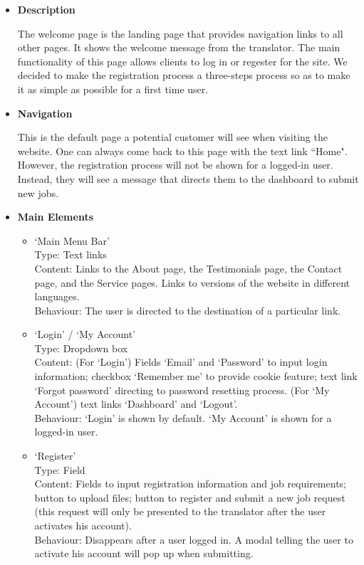 \documentclass{l3proj}
\begin{document}
\begin{itemize}
\item \textbf{Description}

The welcome page is the landing page that provides navigation links to all other pages. It shows the welcome message from the translator.
The main functionality of this page allows clients to log in or regester for the site. 
We decided to make the registration process a three-steps process so as to make it as simple as possible for a first time user.

\item \textbf{Navigation}

This is the default page a potential customer will see when visiting the website. One can always come back to this page with the text link ``Home".
However, the registration process will not be shown for a logged-in user. Instead, they will see a message that directs them to the dashboard to submit new jobs.

\item \textbf{Main Elements}
\begin{itemize}
\item `Main Menu Bar'\\
Type: Text links\\
Content: Links to the About page, the Testimonials page, the Contact page, and the Service pages. Links to versions of the website in different languages. \\
Behaviour: The user is directed to the destination of a particular link. \\

\item `Login' / `My Account'\\
Type: Dropdown box\\
Content: (For `Login') Fields `Email' and `Password' to input login information; checkbox `Remember me' to provide cookie feature; 
text link `Forgot password' directing to password resetting process. (For `My Account') text links `Dashboard' and `Logout'.\\
Behaviour: `Login' is shown by default. `My Account' is shown for a logged-in user.\\

\item `Register'\\
Type: Field\\
Content: Fields to input registration information and job requirements; button to upload files; 
button to register and submit a new job request (this request will only be presented to the translator after the user activates his account).\\
Behaviour: Disappears after a user logged in. A modal telling the user to activate his account will pop up when submitting. \\
\end{itemize}
\end{itemize}
\end{document}

